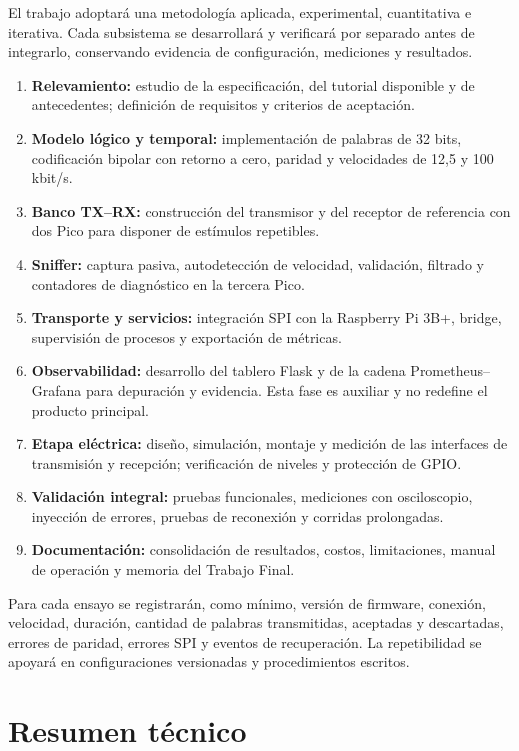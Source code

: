 \documentclass[12pt,a4paper,oneside]{article}
\begin{document}
El trabajo adoptará una metodología aplicada, experimental, cuantitativa e iterativa. Cada subsistema se desarrollará y verificará por separado antes de integrarlo, conservando evidencia de configuración, mediciones y resultados.

\begin{enumerate}
  \item \textbf{Relevamiento:} estudio de la especificación, del tutorial disponible y de antecedentes; definición de requisitos y criterios de aceptación.
  \item \textbf{Modelo lógico y temporal:} implementación de palabras de 32 bits, codificación bipolar con retorno a cero, paridad y velocidades de 12,5 y 100 kbit/s.
  \item \textbf{Banco TX--RX:} construcción del transmisor y del receptor de referencia con dos Pico para disponer de estímulos repetibles.
  \item \textbf{Sniffer:} captura pasiva, autodetección de velocidad, validación, filtrado y contadores de diagnóstico en la tercera Pico.
  \item \textbf{Transporte y servicios:} integración SPI con la Raspberry Pi 3B+, bridge, supervisión de procesos y exportación de métricas.
  \item \textbf{Observabilidad:} desarrollo del tablero Flask y de la cadena Prometheus--Grafana para depuración y evidencia. Esta fase es auxiliar y no redefine el producto principal.
  \item \textbf{Etapa eléctrica:} diseño, simulación, montaje y medición de las interfaces de transmisión y recepción; verificación de niveles y protección de GPIO.
  \item \textbf{Validación integral:} pruebas funcionales, mediciones con osciloscopio, inyección de errores, pruebas de reconexión y corridas prolongadas.
  \item \textbf{Documentación:} consolidación de resultados, costos, limitaciones, manual de operación y memoria del Trabajo Final.
\end{enumerate}

Para cada ensayo se registrarán, como mínimo, versión de firmware, conexión, velocidad, duración, cantidad de palabras transmitidas, aceptadas y descartadas, errores de paridad, errores SPI y eventos de recuperación. La repetibilidad se apoyará en configuraciones versionadas y procedimientos escritos.

\section{Resumen técnico}
\end{document}
